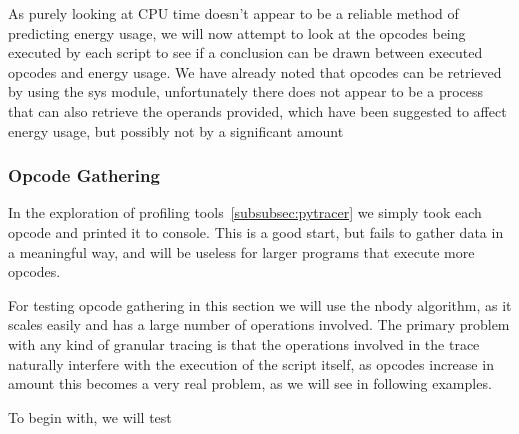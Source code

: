As purely looking at CPU time doesn't appear to be a reliable method of predicting energy usage, we will now attempt to
look at the opcodes being executed by each script to see if a conclusion can be drawn between executed opcodes and
energy usage.
We have already noted that opcodes can be retrieved by using the sys module, unfortunately there does not appear to be
a process that can also retrieve the operands provided, which have been suggested to affect energy usage, but possibly
not by a significant amount~\cite{OperandPower}

\subsubsection{Opcode Gathering}
In the exploration of profiling tools~\ref{subsubsec:pytracer} we simply took each opcode and printed it to console.
This is a good start, but fails to gather data in a meaningful way, and will be useless for larger programs that execute
more opcodes.

For testing opcode gathering in this section we will use the nbody algorithm, as it scales easily and has a large number
of operations involved.
The primary problem with any kind of granular tracing is that the operations involved in the trace naturally interfere
with the execution of the script itself, as opcodes increase in amount this becomes a very real problem, as we will see
in following examples.

To begin with, we will test